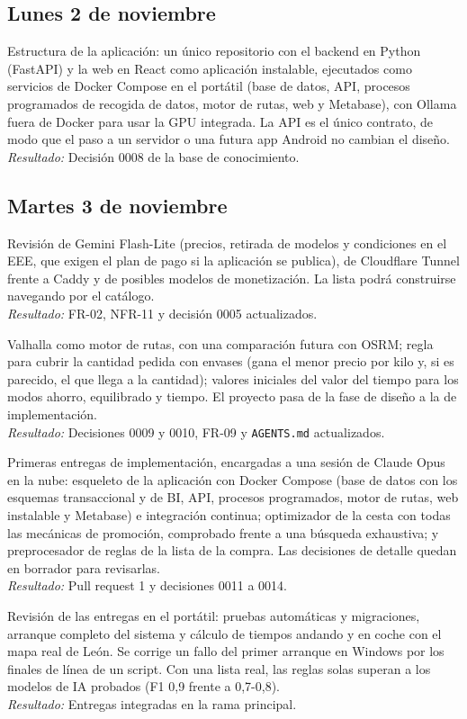 \documentclass[11pt,a4paper]{article}
\newcommand{\actividad}[3]{\item[\textbf{[#1]}] #2 \\ \textit{Resultado:} #3}
\begin{document}
	\subsection*{Lunes 2 de noviembre}
	\begin{description}[leftmargin=0pt, itemsep=6pt]
		\actividad{Decisión}{Estructura de la aplicación: un único repositorio con el backend en Python (FastAPI) y la web en React como aplicación instalable, ejecutados como servicios de Docker Compose en el portátil (base de datos, API, procesos programados de recogida de datos, motor de rutas, web y Metabase), con Ollama fuera de Docker para usar la GPU integrada. La API es el único contrato, de modo que el paso a un servidor o una futura app Android no cambian el diseño.}{Decisión 0008 de la base de conocimiento.}
	\end{description}

	\subsection*{Martes 3 de noviembre}
	\begin{description}[leftmargin=0pt, itemsep=6pt]
		\actividad{Análisis}{Revisión de Gemini Flash-Lite (precios, retirada de modelos y condiciones en el EEE, que exigen el plan de pago si la aplicación se publica), de Cloudflare Tunnel frente a Caddy y de posibles modelos de monetización. La lista podrá construirse navegando por el catálogo.}{FR-02, NFR-11 y decisión 0005 actualizados.}
		\actividad{Decisión}{Valhalla como motor de rutas, con una comparación futura con OSRM; regla para cubrir la cantidad pedida con envases (gana el menor precio por kilo y, si es parecido, el que llega a la cantidad); valores iniciales del valor del tiempo para los modos ahorro, equilibrado y tiempo. El proyecto pasa de la fase de diseño a la de implementación.}{Decisiones 0009 y 0010, FR-09 y \texttt{AGENTS.md} actualizados.}
		\actividad{Tarea}{Primeras entregas de implementación, encargadas a una sesión de Claude Opus en la nube: esqueleto de la aplicación con Docker Compose (base de datos con los esquemas transaccional y de BI, API, procesos programados, motor de rutas, web instalable y Metabase) e integración continua; optimizador de la cesta con todas las mecánicas de promoción, comprobado frente a una búsqueda exhaustiva; y preprocesador de reglas de la lista de la compra. Las decisiones de detalle quedan en borrador para revisarlas.}{Pull request 1 y decisiones 0011 a 0014.}
		\actividad{Análisis}{Revisión de las entregas en el portátil: pruebas automáticas y migraciones, arranque completo del sistema y cálculo de tiempos andando y en coche con el mapa real de León. Se corrige un fallo del primer arranque en Windows por los finales de línea de un script. Con una lista real, las reglas solas superan a los modelos de IA probados (F1 0,9 frente a 0,7-0,8).}{Entregas integradas en la rama principal.}
	\end{description}
\end{document}
